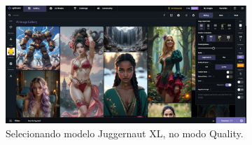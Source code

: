 \begin{figure}[htbp]
    \centering
    \caption{\small Processo da utilização 2 do CGDream (Imagem)}
    \label{fig:cgDream2}
    \begin{subfigure}{1\linewidth}
        \includegraphics[width=1\linewidth]{figs/cgDream/tela_analise.png}
        \caption{\small Selecionando modelo Juggernaut XL, no modo Quality.}
        \label{fig:cgDream2a}
    \end{subfigure}
    \begin{subfigure}{0.15\linewidth}

\end{subfigure}
\end{figure}
